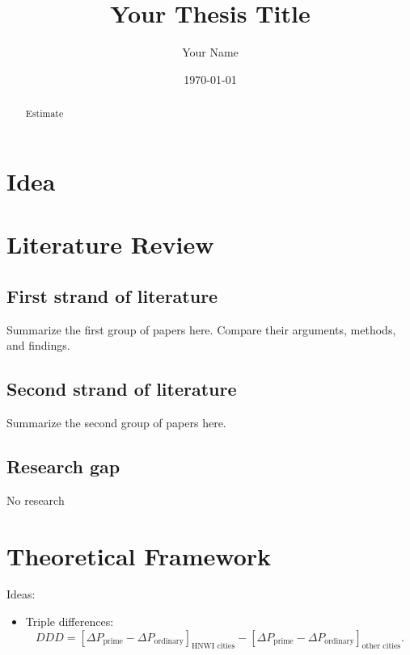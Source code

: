 \documentclass[12pt,a4paper]{article}
\title{Your Thesis Title}
\author{Your Name}
\date{\today}
\begin{document}
\maketitle

\begin{abstract}


Estimate

\end{abstract}

\tableofcontents
\newpage

\section{Idea}




\section{Literature Review}


\subsection{First strand of literature}

Summarize the first group of papers here. Compare their arguments, methods, and findings.

\subsection{Second strand of literature}

Summarize the second group of papers here.

\subsection{Research gap}

No research 
\section{Theoretical Framework}

Ideas: 

\begin{itemize}
\item Triple differences: 
\[
DDD
=
\left[
\Delta P_{\text{prime}}
-
\Delta P_{\text{ordinary}}
\right]_{\text{HNWI cities}}
-
\left[
\Delta P_{\text{prime}}
-
\Delta P_{\text{ordinary}}
\right]_{\text{other cities}}.
\]
\end{itemize}
\end{document}
